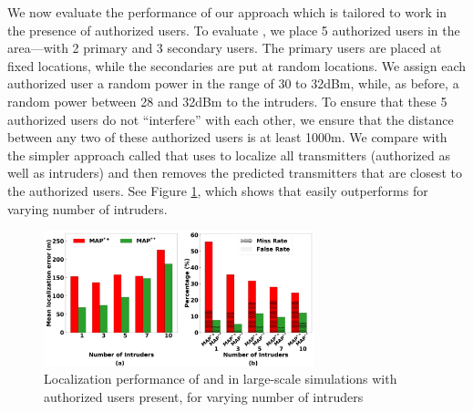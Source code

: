   We now evaluate
the performance of our \ouralgoss approach which is tailored to work
in the presence of authorized users. To evaluate \ouralgoss, we place
5 authorized users in the area---with 2 primary and 3 secondary users.
The primary users are placed at fixed locations, while the secondaries
are put at random locations. We assign each authorized user a random
power in the range of 30 to 32dBm, while, as before, a random power
between 28 and 32dBm to the intruders. To ensure that these 5
authorized users do not ``interfere'' with each other, we ensure that
the distance between any two of these authorized users is at least
1000m.
We compare \ouralgoss with the simpler approach called \ouralgos that
uses \ouralgo to localize all transmitters (authorized as well as
intruders) and then removes the predicted transmitters that are
closest to the authorized users.
See Figure \ref{fig:shared-spectrum}, which shows that \ouralgoss easily
outperforms \ouralgos for varying number of intruders. 

\begin{figure}[ht]
	\centering
	\includegraphics[width=0.7\textwidth]{chapters/ipsn/figures/splat-vary-numauthorized.png}
	\caption{Localization performance of \ouralgos and \ouralgoss in large-scale simulations with authorized users present, for varying number of intruders}
	\label{fig:shared-spectrum}
\end{figure}
